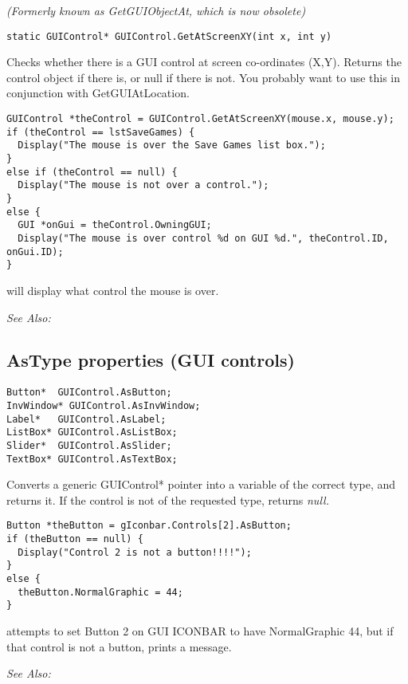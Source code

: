 \it{(Formerly known as GetGUIObjectAt, which is now obsolete)}

\begin{verbatim}
static GUIControl* GUIControl.GetAtScreenXY(int x, int y)
\end{verbatim}
Checks whether there is a GUI control at screen co-ordinates (X,Y). Returns
the control object if there is, or null if there is not. You probably
want to use this in conjunction with GetGUIAtLocation.

\begin{verbatim}
GUIControl *theControl = GUIControl.GetAtScreenXY(mouse.x, mouse.y);
if (theControl == lstSaveGames) {
  Display("The mouse is over the Save Games list box.");
}
else if (theControl == null) {
  Display("The mouse is not over a control.");
}
else {
  GUI *onGui = theControl.OwningGUI;
  Display("The mouse is over control %d on GUI %d.", theControl.ID, onGui.ID);
}
\end{verbatim}
will display what control the mouse is over.

\it{See Also:} 


\subsection{AsType properties (GUI controls)}\label{GUIControl.AsType}%

\begin{verbatim}
Button*  GUIControl.AsButton;
InvWindow* GUIControl.AsInvWindow;
Label*   GUIControl.AsLabel;
ListBox* GUIControl.AsListBox;
Slider*  GUIControl.AsSlider;
TextBox* GUIControl.AsTextBox;
\end{verbatim}
Converts a generic GUIControl* pointer into a variable of the correct type, and returns
it. If the control is not of the requested type, returns \it{null}.

\begin{verbatim}
Button *theButton = gIconbar.Controls[2].AsButton;
if (theButton == null) {
  Display("Control 2 is not a button!!!!");
}
else {
  theButton.NormalGraphic = 44;
}
\end{verbatim}
attempts to set Button 2 on GUI ICONBAR to have NormalGraphic 44, but if that
control is not a button, prints a message.

\it{See Also:} 


